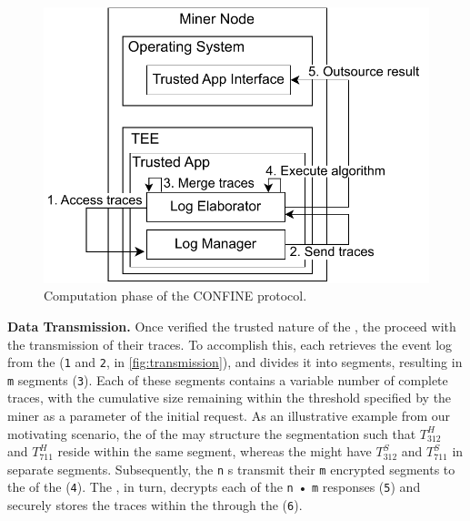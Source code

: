 \begin{figure}
	\vspace{-2em}
	\includegraphics[width=1\textwidth]{content/figures/computationworkflow.pdf}
	\caption[A gull]{Computation phase of the CONFINE protocol.}
	\vspace{-2pt}
	\label{fig:workflow2}
\end{figure}
\textbf{Data Transmission.} Once verified the trusted nature of the , the  proceed with the transmission of their traces. To accomplish this, each  retrieves the event log from the  (\texttt{1} and \texttt{2}, in \cref{fig:transmission}), and divides it into segments, resulting in \texttt{m} segments (\texttt{3}). Each of these segments contains a variable number of complete traces, with the cumulative size remaining within the threshold specified by the miner as a parameter of the initial request. As an illustrative example from our motivating scenario, the  of the  may structure the segmentation such that $T^H_{312}$ and $T^H_{711}$ reside within the same segment, whereas the  might have $T^S_{312}$ and $T^S_{711}$ in separate segments. Subsequently, the \texttt{n} s transmit their \texttt{m} encrypted segments to the  of the  (\texttt{4}). The , in turn, decrypts each of the \texttt{n} • \texttt{m} responses (\texttt{5}) and securely stores the traces within the  through the  (\texttt{6}).


